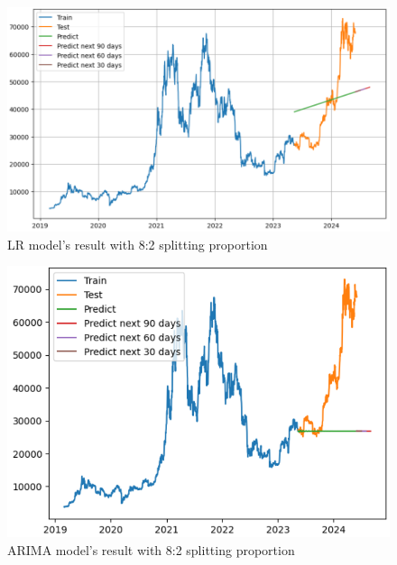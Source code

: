 \documentclass{ieeeojies}
\begin{document}
\begin{figure}[H]
	\centering
	\begin{minipage}{0.8\linewidth}
		\centering
		\includegraphics[width=\linewidth]{bibliography/Images/LR_BTC_82.PNG}
		\caption{LR model's result with 8:2 splitting proportion}
	\end{minipage}
\end{figure}
\begin{figure}[H]
	\centering
	\begin{minipage}{0.8\linewidth}
		\centering
		\includegraphics[width=\linewidth]{bibliography/Images/ARIMA_BTC_82.PNG}
		\caption{ARIMA model's result with 8:2 splitting proportion}
	\end{minipage}
\end{figure}
\end{document}
